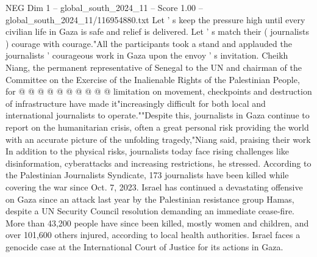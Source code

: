 \begin{textsample}{NEG Dim 1 – global\_south\_2024\_11 – Score 1.00 – global\_south\_2024\_11/116954880.txt}
Let ' s keep the pressure high until every civilian life in Gaza is safe and relief is delivered.
Let ' s match their ( journalists ) courage with courage."All the participants took a stand and applauded the journalists ' courageous work in Gaza upon the envoy ' s invitation.
Cheikh Niang, the permanent representative of Senegal to the UN and chairman of the Committee on the Exercise of the Inalienable Rights of the Palestinian People, for @ @ @ @ @ @ @ @ @ @ limitation on movement, checkpoints and destruction of infrastructure have made it"increasingly difficult for both local and international journalists to operate.""Despite this, journalists in Gaza continue to report on the humanitarian crisis, often a great personal risk providing the world with an accurate picture of the unfolding tragedy,"Niang said, praising their work In addition to the physical risks, journalists today face rising challenges like disinformation, cyberattacks and increasing restrictions, he stressed.
According to the Palestinian Journalists Syndicate, 173 journalists have been killed while covering the war since Oct. 7, 2023.
Israel has continued a devastating offensive on Gaza since an attack last year by the Palestinian resistance group Hamas, despite a UN Security Council resolution demanding an immediate cease-fire.
More than 43,200 people have since been killed, mostly women and children, and over 101,600 others injured, according to local health authorities.
Israel faces a genocide case at the International Court of Justice for its actions in Gaza.

\end{textsample}
